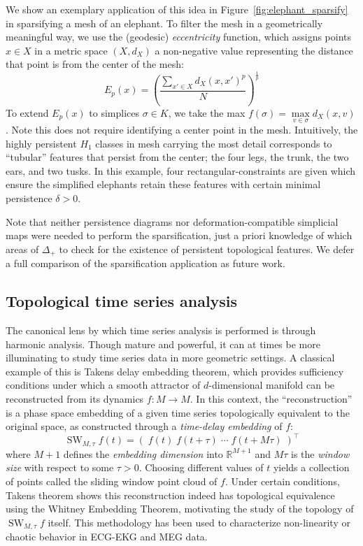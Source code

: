 \documentclass[pdflatex,sn-mathphys-num]{sn-jnl}
\begin{document}
We show an exemplary application of this idea in Figure~\ref{fig:elephant_sparsify} in sparsifying a mesh of an elephant. To filter the mesh in a geometrically meaningful way, we use the (geodesic) \emph{eccentricity} function, which assigns points \(x \in X\) in a metric space \(\left( X,d_{X} \right)\) a non-negative value representing the distance that point is from the center of the mesh:
\[\label{eq:eccentricity}
	E_{p}(x) = \left. \left( \frac{\sum_{x' \in X}d_{X}(x,x')^{p}}{N} \right) \right.^{\frac{1}{p}}
\]
\noindent To extend \(E_{p}(x)\) to simplices \(\sigma \in K\), we take the max \(f(\sigma) = \max\limits_{v \in \sigma}d_{X}(x,v)\). Note this does not require identifying a center point in the mesh. Intuitively, the highly persistent \(H_{1}\) classes in mesh carrying the most detail corresponds to ``tubular'' features that persist from the center; the four legs, the trunk, the two ears, and two tusks. In this example, four rectangular-constraints are given which ensure the simplified elephants retain these features with certain minimal persistence \(\delta > 0\).

Note that neither persistence diagrams nor deformation-compatible simplicial maps were needed to perform the sparsification, just a priori knowledge of which areas of \(\Delta_{+}\) to check for the existence of persistent topological features. We defer a full comparison of the sparsification application as future work.

\subsection{Topological time series analysis}\label{sec:topological_time_series}

The canonical lens by which time series analysis is performed is through harmonic analysis. Though mature and powerful, it can at times be more illuminating to study time series data in more geometric settings. A classical example of this is Takens delay embedding theorem, which provides sufficiency conditions under which a smooth attractor of \(d\)-dimensional manifold can be reconstructed from its dynamics \(f:M \rightarrow M\). In this context, the ``reconstruction'' is a phase space embedding of a given time series topologically equivalent to the original space, as constructed through a \emph{time-delay embedding} of \(f\):
\[
	\operatorname{SW}_{M,\tau}f(t) = ( \; f(t) \;  f(t + \tau) \; \cdots \; f(t + M\tau) \; )^{\top}
\]
\noindent where \(M + 1\) defines the \emph{embedding dimension} into \(\mathbb{R}^{M + 1}\) and \(M\tau\) is the \emph{window size} with respect to some \(\tau > 0\). Choosing different values of \(t\) yields a collection of points called the sliding window point cloud of \(f\). Under certain conditions, Takens theorem shows this reconstruction indeed has topological equivalence using the Whitney Embedding Theorem, motivating the study of the topology of \(\operatorname{SW}_{M,\tau}f\) itself. This methodology has been used to characterize non-linearity or chaotic behavior in ECG-EKG and MEG data.
\end{document}
